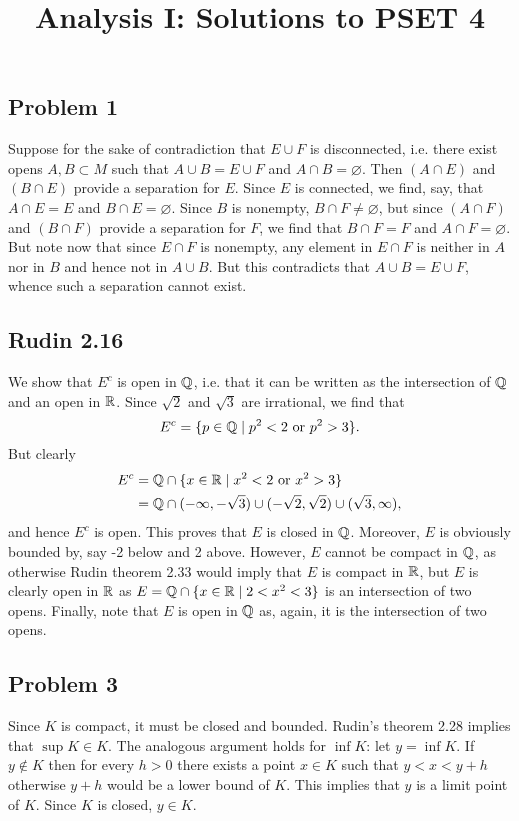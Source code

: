 \documentclass{../mathnotes}
\title{Analysis I: Solutions to PSET 4}
\author{}
\date{}
\begin{document}
\maketitle

\subsection*{Problem 1}
Suppose for the sake of contradiction that $E\cup F$ is disconnected, i.e. there exist opens
$A,B\subset M$ such that $A\cup B=E\cup F$ and $A\cap B=\varnothing$. Then $(A \cap E)$ and
$(B\cap E)$ provide a separation for $E$. Since $E$ is connected, we find, say, that $A\cap E=E$
and $B\cap E=\varnothing$. Since $B$ is nonempty, $B\cap F\neq\varnothing$, but since $(A\cap F)$
and $(B\cap F)$ provide a separation for $F$, we find that $B\cap F=F$ and $A\cap F=\varnothing$.
But note now that since $E\cap F$ is nonempty, any element in $E\cap F$ is neither in $A$ nor in $B$
and hence not in $A\cup B$. But this contradicts that $A\cup B=E\cup F$, whence such a separation
cannot exist.

\subsection*{Rudin 2.16}
We show that $E^c$ is open in $\mathbb{Q}$, i.e. that it can be written as the intersection of $\mathbb{Q}$ and an
open in $\mathbb{R}$. Since $\sqrt{2}$ and $\sqrt{3}$ are irrational, we find that
\[E^c=\{p\in\mathbb{Q} \mid p^2<2 \text{ or }p^2>3\}.\]
But clearly
\begin{align*}
    E^c &= \mathbb{Q}\cap\{x\in\mathbb{R}\mid x^2<2\text{ or }x^2>3\}\\
    &=\mathbb{Q} \cap (-\infty,-\sqrt{3})\cup(-\sqrt{2},\sqrt{2})\cup(\sqrt{3},\infty),
\end{align*}
and hence $E^c$ is open. This proves that $E$ is closed in $\mathbb{Q}$. Moreover, $E$ is
obviously bounded by, say -2 below and 2 above. However, $E$ cannot be compact in $\mathbb{Q}$, as otherwise
Rudin theorem 2.33 would imply that $E$ is compact in $\mathbb{R}$, but $E$ is clearly open in $\mathbb{R}$
as $E=\mathbb{Q}\cap \{x\in\mathbb{R}\mid 2<x^2<3\}$ is an intersection of two opens.
Finally, note that $E$ is open in $\mathbb{Q}$ as, again, it is the intersection of two opens.

\subsection*{Problem 3}
Since $K$ is compact, it must be closed and bounded. Rudin's theorem 2.28 implies that $\sup K\in K$.
The analogous argument holds for $\inf K$: let $y=\inf K$. If $y\notin K$ then for every $h>0$
there exists a point $x\in K$ such that $y<x<y+h$ otherwise $y+h$ would be a lower bound of $K$. This
implies that $y$ is a limit point of $K$. Since $K$ is closed, $y\in K$.
\end{document}
